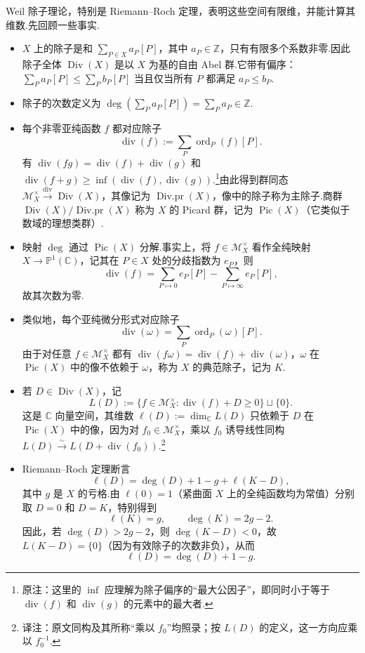 Weil 除子理论，特别是 Riemann--Roch 定理，表明这些空间有限维，并能计算其维数.先回顾一些事实.
\begin{itemize}
\item $X$ 上的除子是和 $\sum_{P\in X}a_P[P]$，其中 $a_P\in\mathbb Z$，只有有限多个系数非零.因此除子全体 $\operatorname{Div}(X)$ 是以 $X$ 为基的自由 Abel 群.它带有偏序：$\sum_Pa_P[P]\le\sum_Pb_P[P]$ 当且仅当所有 $P$ 都满足 $a_P\le b_P$.
\item 除子的次数定义为 $\deg(\sum_Pa_P[P])=\sum_Pa_P\in\mathbb Z$.
\item 每个非零亚纯函数 $f$ 都对应除子
\[
\operatorname{div}(f):=\sum_P\operatorname{ord}_P(f)[P].
\]
有 $\operatorname{div}(fg)=\operatorname{div}(f)+\operatorname{div}(g)$ 和 $\operatorname{div}(f+g)\ge\inf(\operatorname{div}(f),\operatorname{div}(g))$.\footnote{原注：这里的 $\inf$ 应理解为除子偏序的``最大公因子''，即同时小于等于 $\operatorname{div}(f)$ 和 $\operatorname{div}(g)$ 的元素中的最大者.}由此得到群同态 $\mathcal M_X^\times\xrightarrow{\operatorname{div}}\operatorname{Div}(X)$，其像记为 $\operatorname{Div.pr}(X)$，像中的除子称为主除子.商群 $\operatorname{Div}(X)/\operatorname{Div.pr}(X)$ 称为 $X$ 的 Picard 群，记为 $\operatorname{Pic}(X)$（它类似于数域的理想类群）.
\item 映射 $\deg$ 通过 $\operatorname{Pic}(X)$ 分解.事实上，将 $f\in\mathcal M_X^\times$ 看作全纯映射 $X\longrightarrow\mathbb P^1(\mathbb C)$，记其在 $P\in X$ 处的分歧指数为 $e_P$，则
\[
\operatorname{div}(f)=\sum_{P\mapsto0}e_P[P]-\sum_{P\mapsto\infty}e_P[P],
\]
故其次数为零.
\item 类似地，每个亚纯微分形式对应除子
\[
\operatorname{div}(\omega)=\sum_P\operatorname{ord}_P(\omega)[P].
\]
由于对任意 $f\in\mathcal M_X^\times$ 都有 $\operatorname{div}(f\omega)=\operatorname{div}(f)+\operatorname{div}(\omega)$，$\omega$ 在 $\operatorname{Pic}(X)$ 中的像不依赖于 $\omega$，称为 $X$ 的典范除子，记为 $K$.
\item 若 $D\in\operatorname{Div}(X)$，记
\[
L(D):=\{f\in\mathcal M_X^\times:\operatorname{div}(f)+D\ge0\}\sqcup\{0\}.
\]
这是 $\mathbb C$ 向量空间，其维数 $\ell(D):=\dim_{\mathbb C}L(D)$ 只依赖于 $D$ 在 $\operatorname{Pic}(X)$ 中的像，因为对 $f_0\in\mathcal M_X^\times$，乘以 $f_0$ 诱导线性同构 $L(D)\xrightarrow{\sim}L(D+\operatorname{div}(f_0))$.\footnote{译注：原文同构及其所称``乘以 $f_0$''均照录；按 $L(D)$ 的定义，这一方向应乘以 $f_0^{-1}$.}
\item Riemann--Roch 定理断言
\[
\ell(D)=\deg(D)+1-g+\ell(K-D),
\]
其中 $g$ 是 $X$ 的亏格.由 $\ell(0)=1$（紧曲面 $X$ 上的全纯函数均为常值）分别取 $D=0$ 和 $D=K$，特别得到
\[
\ell(K)=g,\qquad\deg(K)=2g-2.
\]
因此，若 $\deg(D)>2g-2$，则 $\deg(K-D)<0$，故 $L(K-D)=\{0\}$（因为有效除子的次数非负），从而
\[
\ell(D)=\deg(D)+1-g.
\]
\end{itemize}
